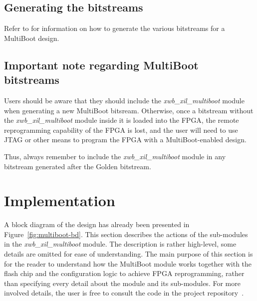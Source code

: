 \documentclass[a4paper,11pt]{article}
\begin{document}
\subsection{Generating the bitstreams}

Refer to \cite{gen-bitstream} for information on how to generate the various
bitstreams for a MultiBoot design.

\subsection{Important note regarding MultiBoot bitstreams}

Users should be aware that they should include the \textit{xwb\_xil\_multiboot} module
when generating a new MultiBoot bitsream. Otherwise, once a bitstream without
the \textit{xwb\_xil\_multiboot} module inside it is loaded into the FPGA, the
remote reprogramming capability of the FPGA is lost, and the user will need
to use JTAG or other means to program the FPGA with a MultiBoot-enabled design.

Thus, always remember to include the \textit{xwb\_xil\_multiboot} module in any bitstream
generated after the Golden bitstream.

\section{Implementation}
\label{sec:implem}

A block diagram of the design has already been presented in
Figure~\ref{fig:multiboot-bd}. This section describes the actions of the sub-modules
in the \textit{xwb\_xil\_multiboot} module. The description is rather high-level,
some details are omitted for ease of understanding. The main purpose of this
section is for the reader to understand how the MultiBoot module works together with
the flash chip and the configuration logic to achieve FPGA reprogramming, rather
than specifying every detail about the module and its sub-modules. For more involved
details, the user is free to consult the code in the project
repository~\cite{gencores-ohwr}.
\end{document}
